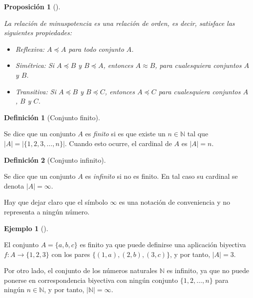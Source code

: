 \documentclass[
  a4paper,
]{scrreport}
\providecommand{\tightlist}{%
  \setlength{\itemsep}{0pt}\setlength{\parskip}{0pt}}\usepackage{longtable,booktabs,array}
\theoremstyle{plain}
\theoremstyle{plain}
\newtheorem{proposition}{Proposición}[chapter]
\theoremstyle{definition}
\newtheorem{definition}{Definición}[chapter]
\theoremstyle{definition}
\newtheorem{example}{Ejemplo}[chapter]
\theoremstyle{plain}
\theoremstyle{remark}
\begin{document}
\begin{proposition}[]\protect\hypertarget{prp-minuspotencia-relacion-orden}{}\label{prp-minuspotencia-relacion-orden}

La relación de minuspotencia es una relación de orden, es decir,
satisface las siguientes propiedades:

\begin{itemize}
\tightlist
\item
  Reflexiva: \(A\preceq A\) para todo conjunto \(A\).
\item
  Simétrica: Si \(A\preceq B\) y \(B\preceq A\), entonces
  \(A\approx B\), para cualesquiera conjuntos \(A\) y \(B\).
\item
  Transitiva: Si \(A\preceq B\) y \(B\preceq C\), entonces
  \(A\preceq C\) para cualesquiera conjuntos \(A\), \(B\) y \(C\).
\end{itemize}

\end{proposition}

\begin{definition}[Conjunto
finito]\protect\hypertarget{def-conjunto-finito}{}\label{def-conjunto-finito}

Se dice que un conjunto \(A\) es \emph{finito} si es que existe un
\(n\in\mathbb{N}\) tal que \(|A| = |\{1,2,3,\ldots,n \}|\). Cuando esto
ocurre, el cardinal de \(A\) es \(|A|=n\).

\end{definition}

\begin{definition}[Conjunto
infinito]\protect\hypertarget{def-conjunto-infinito}{}\label{def-conjunto-infinito}

Se dice que un conjunto \(A\) es \emph{infinito} si no es finito. En tal
caso su cardinal se denota \(|A|=\infty\).

\end{definition}

Hay que dejar claro que el símbolo \(\infty\) es una notación de
conveniencia y no representa a ningún número.

\begin{example}[]\protect\hypertarget{exm-conjunto-finito-infinito}{}\label{exm-conjunto-finito-infinito}

El conjunto \(A=\{a, b, c\}\) es finito ya que puede definirse una
aplicación biyectiva \(f:A\rightarrow \{1, 2, 3\}\) con los pares
\(\{(1,a),(2,b), (3,c)\}\), y por tanto, \(|A| = 3\).

Por otro lado, el conjunto de los números naturales \(\mathbb{N}\) es
infinito, ya que no puede ponerse en correspondencia biyectiva con
ningún conjunto \(\{1,2,\ldots,n\}\) para ningún \(n\in\mathbb{N}\), y
por tanto, \(|\mathbb{N}|=\infty\).

\end{example}
\end{document}
